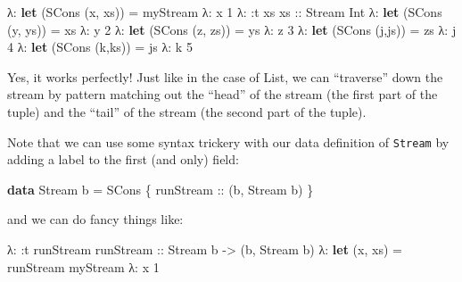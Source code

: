 \documentclass[]{article}
\newenvironment{Shaded}{}{}
\newcommand{\KeywordTok}[1]{\textcolor[rgb]{0.00,0.44,0.13}{\textbf{{#1}}}}
\newcommand{\DataTypeTok}[1]{\textcolor[rgb]{0.56,0.13,0.00}{{#1}}}
\newcommand{\DecValTok}[1]{\textcolor[rgb]{0.25,0.63,0.44}{{#1}}}
\newcommand{\OtherTok}[1]{\textcolor[rgb]{0.00,0.44,0.13}{{#1}}}
\newcommand{\FunctionTok}[1]{\textcolor[rgb]{0.02,0.16,0.49}{{#1}}}
\newcommand{\NormalTok}[1]{{#1}}
\begin{document}
\begin{Shaded}
\begin{Highlighting}[]
\NormalTok{λ}\FunctionTok{:} \KeywordTok{let} \NormalTok{(}\DataTypeTok{SCons} \NormalTok{(x, xs)) }\FunctionTok{=} \NormalTok{myStream}
\NormalTok{λ}\FunctionTok{:} \NormalTok{x}
\DecValTok{1}
\NormalTok{λ}\FunctionTok{:} \FunctionTok{:}\NormalTok{t xs}
\OtherTok{xs ::} \DataTypeTok{Stream} \DataTypeTok{Int}
\NormalTok{λ}\FunctionTok{:} \KeywordTok{let} \NormalTok{(}\DataTypeTok{SCons} \NormalTok{(y, ys)) }\FunctionTok{=} \NormalTok{xs}
\NormalTok{λ}\FunctionTok{:} \NormalTok{y}
\DecValTok{2}
\NormalTok{λ}\FunctionTok{:} \KeywordTok{let} \NormalTok{(}\DataTypeTok{SCons} \NormalTok{(z, zs)) }\FunctionTok{=} \NormalTok{ys}
\NormalTok{λ}\FunctionTok{:} \NormalTok{z}
\DecValTok{3}
\NormalTok{λ}\FunctionTok{:} \KeywordTok{let} \NormalTok{(}\DataTypeTok{SCons} \NormalTok{(j,js)) }\FunctionTok{=} \NormalTok{zs}
\NormalTok{λ}\FunctionTok{:} \NormalTok{j}
\DecValTok{4}
\NormalTok{λ}\FunctionTok{:} \KeywordTok{let} \NormalTok{(}\DataTypeTok{SCons} \NormalTok{(k,ks)) }\FunctionTok{=} \NormalTok{js}
\NormalTok{λ}\FunctionTok{:} \NormalTok{k}
\DecValTok{5}
\end{Highlighting}
\end{Shaded}

Yes, it works perfectly! Just like in the case of List, we can ``traverse'' down the stream by
pattern matching out the ``head'' of the stream (the first part of the tuple) and the ``tail'' of
the stream (the second part of the tuple).

Note that we can use some syntax trickery with our data definition of \texttt{Stream} by adding a
label to the first (and only) field:

\begin{Shaded}
\begin{Highlighting}[]
\KeywordTok{data} \DataTypeTok{Stream} \NormalTok{b }\FunctionTok{=} \DataTypeTok{SCons} \NormalTok{\{}\OtherTok{ runStream ::} \NormalTok{(b, }\DataTypeTok{Stream} \NormalTok{b) \}}
\end{Highlighting}
\end{Shaded}

and we can do fancy things like:

\begin{Shaded}
\begin{Highlighting}[]
\NormalTok{λ}\FunctionTok{:} \FunctionTok{:}\NormalTok{t runStream}
\OtherTok{runStream ::} \DataTypeTok{Stream} \NormalTok{b }\OtherTok{->} \NormalTok{(b, }\DataTypeTok{Stream} \NormalTok{b)}
\NormalTok{λ}\FunctionTok{:} \KeywordTok{let} \NormalTok{(x, xs) }\FunctionTok{=} \NormalTok{runStream myStream}
\NormalTok{λ}\FunctionTok{:} \NormalTok{x}
\DecValTok{1}
\end{Highlighting}
\end{Shaded}
\end{document}

